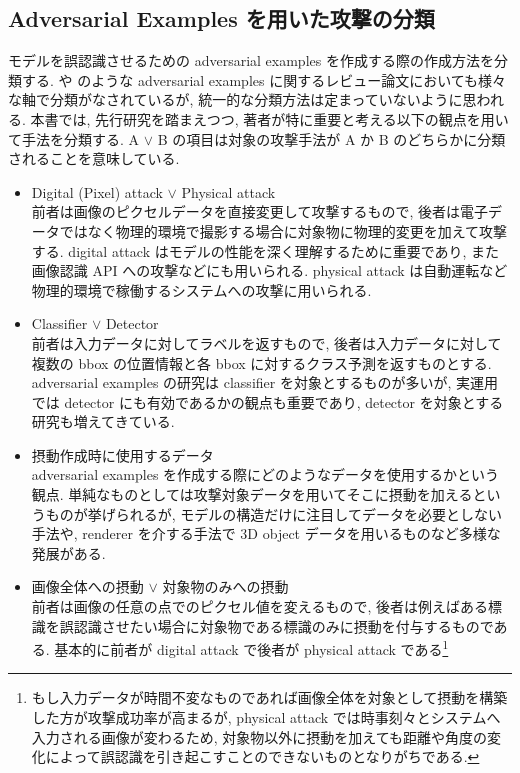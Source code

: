 \subsection{Adversarial Examples を用いた攻撃の分類}
\label{subsec:classification-attack}
モデルを誤認識させるための adversarial examples を作成する際の作成方法を分類する.
\cite{yuan2019adversarial} や \cite{wiyatno2019adversarial} のような adversarial examples に関するレビュー論文においても様々な軸で分類がなされているが, 統一的な分類方法は定まっていないように思われる.
本書では, 先行研究を踏まえつつ, 著者が特に重要と考える以下の観点を用いて手法を分類する.
A $\lor$ B の項目は対象の攻撃手法が A か B のどちらかに分類されることを意味している.
%
\begin{itemize}
  \item Digital (Pixel) attack $\lor$ Physical attack\\
  前者は画像のピクセルデータを直接変更して攻撃するもので, 後者は電子データではなく物理的環境で撮影する場合に対象物に物理的変更を加えて攻撃する.
  digital attack はモデルの性能を深く理解するために重要であり, また画像認識 API への攻撃などにも用いられる.
  physical attack は自動運転など物理的環境で稼働するシステムへの攻撃に用いられる.
  \item Classifier $\lor$ Detector\\
  前者は入力データに対してラベルを返すもので, 後者は入力データに対して複数の bbox の位置情報と各 bbox に対するクラス予測を返すものとする.
  adversarial examples の研究は classifier を対象とするものが多いが, 実運用では detector にも有効であるかの観点も重要であり, detector を対象とする研究も増えてきている.
  \item 摂動作成時に使用するデータ\\
  adversarial examples を作成する際にどのようなデータを使用するかという観点.
  単純なものとしては攻撃対象データを用いてそこに摂動を加えるというものが挙げられるが, モデルの構造だけに注目してデータを必要としない手法や, renderer を介する手法で 3D object データを用いるものなど多様な発展がある.
  \item 画像全体への摂動 $\lor$ 対象物のみへの摂動\\
  前者は画像の任意の点でのピクセル値を変えるもので, 後者は例えばある標識を誤認識させたい場合に対象物である標識のみに摂動を付与するものである.
  基本的に前者が digital attack で後者が physical attack である\footnote{
  もし入力データが時間不変なものであれば画像全体を対象として摂動を構築した方が攻撃成功率が高まるが, physical attack では時事刻々とシステムへ入力される画像が変わるため, 対象物以外に摂動を加えても距離や角度の変化によって誤認識を引き起こすことのできないものとなりがちである.
}
\end{itemize}
